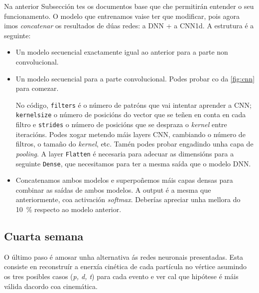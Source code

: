 \documentclass[11pt, a4paper]{article}
\begin{document}
Na anterior Subsección tes os documentos base que che permitirán entender o seu funcionamento. O modelo que entrenamos vaise ter que modificar, pois agora imos \textit{concatenar} os resultados de dúas redes: a DNN + a CNN1d. A estrutura é a seguinte:

\begin{itemize}
    \item Un modelo secuencial exactamente igual ao anterior para a parte non convolucional.
    \item Un modelo secuencial para a parte convolucional. Podes probar co da \autoref{fig:cnn} para comezar.

    No código, \verb|filters| é o número de patróns que vai intentar aprender a CNN; \texttt{kernelsize} o número de posicións do vector que se teñen en conta en cada  filtro e \verb|strides| o número de posicións que se despraza o \textit{kernel} entre iteracións. Podes xogar metendo máis layers CNN, cambiando o número de filtros, o tamaño do \textit{kernel}, etc. Tamén podes probar engadindo unha capa de \textit{pooling}. A layer \verb|Flatten| é necesaria para adecuar as dimensións para a seguinte \verb|Dense|, que necesitamos para ter a mesma saída que o modelo DNN.

    \item Concatenamos ambos modelos e superpoñemos máis capas densas para combinar as saídas de ambos modelos. A output é a mesma que anteriormente, coa activación \textit{softmax}. Deberías apreciar unha mellora do \qty{10}{\percent} respecto ao modelo anterior.
\end{itemize}
\subsection{Cuarta semana}
O último paso é amosar unha alternativa ás redes neuronais presentadas. Esta consiste en reconstruír a enerxía cinética de cada partícula no vértice asumindo os tres posibles casos (\textit{p, d, t}) para cada evento e ver cal que hipótese é máis válida dacordo coa cinemática.
\end{document}
